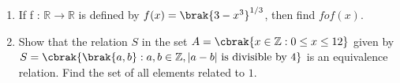 \begin{enumerate}
\item If f : $\mathbb{R} \rightarrow \mathbb{R}$ is defined by $f(x) = \brak{3 - x^3}^{1/3}$, then find $fof(x)$.

\item Show that the relation $S$ in the set $A = \cbrak{x \in \mathbb{Z} : 0 \leq x \leq 12}$ given by $S = \cbrak{\brak{a, b} : a, b \in \mathbb{Z}, |a - b| \text{ is divisible by 4}}$ is an equivalence relation.  Find the set of all elements related to $1$.
\end{enumerate}